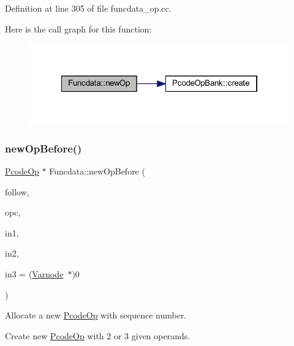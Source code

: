 Definition at line 305 of file funcdata\+\_\+op.\+cc.

Here is the call graph for this function\+:
\nopagebreak
\begin{figure}[H]
\begin{center}
\leavevmode
\includegraphics[width=322pt]{class_funcdata_a0d122aa09d739e59a5107338f8ecd8ab_cgraph}
\end{center}
\end{figure}
\mbox{\label{class_funcdata_ae1126d213d88120c9e55b5779d746859}} 
\subsubsection{\texorpdfstring{newOpBefore()}{newOpBefore()}}
{\footnotesize\ttfamily \mbox{\hyperlink{class_pcode_op}{Pcode\+Op}} $\ast$ Funcdata\+::new\+Op\+Before (\begin{DoxyParamCaption}\item[{\mbox{\hyperlink{class_pcode_op}{Pcode\+Op}} $\ast$}]{follow,  }\item[{\mbox{\hyperlink{opcodes_8hh_abeb7dfb0e9e2b3114e240a405d046ea7}{Op\+Code}}}]{opc,  }\item[{\mbox{\hyperlink{class_varnode}{Varnode}} $\ast$}]{in1,  }\item[{\mbox{\hyperlink{class_varnode}{Varnode}} $\ast$}]{in2,  }\item[{\mbox{\hyperlink{class_varnode}{Varnode}} $\ast$}]{in3 = {\ttfamily (\mbox{\hyperlink{class_varnode}{Varnode}}~$\ast$)0} }\end{DoxyParamCaption})}



Allocate a new \mbox{\hyperlink{class_pcode_op}{Pcode\+Op}} with sequence number. 

Create new \mbox{\hyperlink{class_pcode_op}{Pcode\+Op}} with 2 or 3 given operands.

